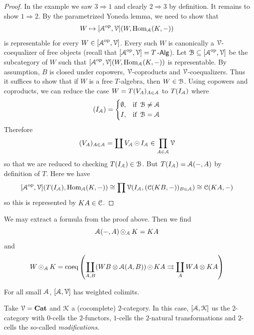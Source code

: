 \documentclass[a4paper,11pt,oneside,openany]{scrbook}
\begin{document}
\begin{proof}
In the example we saw $3\Rightarrow1$ and clearly $2\Rightarrow3$ by definition. It remains to show $1\Rightarrow2$. By the parametrized Yoneda lemma, we need to show that 
$$W\mapsto[\A^{\op},\V](W,\Hom_{\A}(K,-))$$
is representable for every $W\in[\A^{\op},\V]$. Every such $W$ is canonically a $\V$-coequalizer of free objects (recall that $[\A^{\op},\V]=T\Alg$). Let $\B\subseteq[\A^{\op},\V]$ be the subcategory of $W$ such that $[\A^{\op},\V](W,\Hom_{\A}(K,-))$ is representable. By assumption, $B$ is closed under copowers, $\V$-coproducts and $\V$-coequalizers. Thus it suffices to show that if $W$ is a free $T$-algebra, then $W\in\B$. Using copowers and coproducts, we can reduce the case $W=T(V_A)_{A\in\A}$ to $T(I_{\A})$ where 
$$(I_{\A})=\begin{cases} \emptyset, & \mbox{if } \B\ne\A \\ I, & \mbox{if } \B=\A
\end{cases}$$
Therefore $$(V_A)_{A\in\A}=\coprod{V_{\A}\copw I_{\A}}\in\prod_{A\in\A}\V$$
so that we are reduced to checking $T(I_{\A})\in\B$. But $T(I_{\A})=\A(-,A)$ by definition of $T$. Here we have 
$$[\A^{\op},\V](T(I_{\A}),\Hom_{\A}(K,-))\cong\prod\V(I_{\A},(\C(KB,-))_{B\in\A})\cong\C(KA,-)$$
so this is represented by $KA\in\C$.
\end{proof}
\begin{rmk}
   We may extract a formula from the proof above. Then we find $$\A(-,A)\copw_{\A}K=KA$$ and $$W\copw_{\A}K=\text{coeq}\left(\coprod_{A,B}(WB\otimes\A(A,B))\copw KA\rightrightarrows\coprod_{A}WA\otimes KA \right)$$
\end{rmk}
\begin{cor}
    For all small $\A$, $[\A,\V]$ has weighted colimits.
\end{cor}
\begin{exmp}
    Take $\V=\Cat$ and $\K$ a (cocomplete) $2$-category. In this case, $[\A,\K]$ us the $2$-category with $0$-cells the $2$-functors, $1$-cells the $2$-natural transformations and $2$-cells the so-called \emph{modifications}.
\end{exmp}
\end{document}
